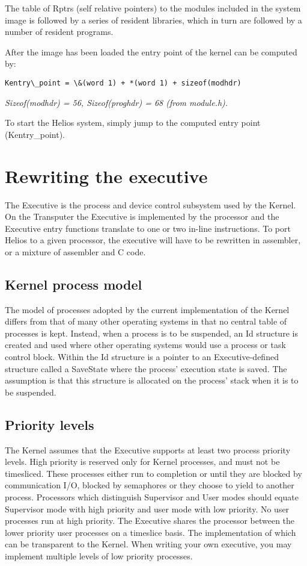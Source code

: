 The table of Rptrs (self relative pointers) to the modules included in the
system image is followed by a series of resident libraries, which in turn
are followed by a number of resident programs.

After the image has been loaded the entry point of the kernel can be
computed by:
\scriptsize
\begin{verbatim}
Kentry\_point = \&(word 1) + *(word 1) + sizeof(modhdr)
\end{verbatim}


{\it Sizeof(modhdr) = 56, Sizeof(proghdr) = 68 (from module.h).}
\vspace{0.25cm}
\normalsize

To start the Helios system, simply jump to the computed entry point
(Kentry\_point).

\section{Rewriting the executive}

The Executive is the process and device control subsystem used by the Kernel.
On the Transputer the Executive is implemented by the processor and the 
Executive entry functions translate to one or two in-line instructions.
To port Helios to a given processor, the executive will have to be rewritten
in assembler, or a mixture of assembler and C code.

\subsection{Kernel process model}

The model of processes adopted by the current implementation of the
Kernel differs from that of many other
operating systems in that no central table of processes is kept.
Instead, when a process is to be suspended, an Id structure is created
and used where other operating systems would use a process or task control
block.
Within the Id structure is a pointer to an Executive-defined structure
called a SaveState where the process' execution state is saved.
The assumption is that this structure is allocated on the process' stack
when it is to be suspended.

\subsection{Priority levels}

The Kernel assumes that the Executive supports at least two process priority
levels.
High priority is reserved only for Kernel processes, and must not be timesliced.
These processes either run to completion or until they are blocked by
communication I/O, blocked by semaphores or they choose to
yield to another process.
Processors which distinguish Supervisor and User modes should equate Supervisor
mode with high priority and user mode with low priority.
No user processes run at high priority. The Executive
shares the processor between the lower priority user processes on 
a timeslice basis. The implementation of which
can be transparent to the Kernel. When writing your own executive, you
may implement multiple levels of low priority processes.

